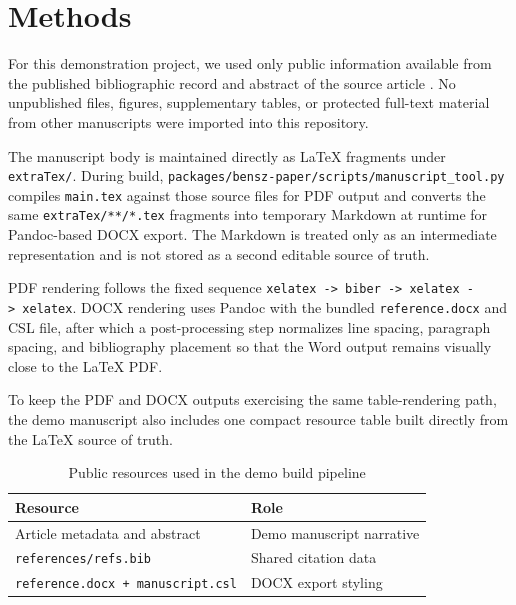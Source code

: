 \section{Methods}
For this demonstration project, we used only public information
available from the published bibliographic record and abstract of the
source article \supercite{Greenhalgh_2026}. No unpublished files, figures,
supplementary tables, or protected full-text material from other
manuscripts were imported into this repository.

The manuscript body is maintained directly as LaTeX fragments under
\texttt{extraTex/}. During build,
\texttt{packages/bensz-paper/scripts/manuscript\_tool.py} compiles
\texttt{main.tex} against those source files for PDF output and converts
the same \texttt{extraTex/**/*.tex} fragments into temporary Markdown at
runtime for Pandoc-based DOCX export. The Markdown is treated only as an
intermediate representation and is not stored as a second editable
source of truth.

PDF rendering follows the fixed sequence
\texttt{xelatex\ -\textgreater{}\ biber\ -\textgreater{}\ xelatex\ -\textgreater{}\ xelatex}.
DOCX rendering uses Pandoc with the bundled \texttt{reference.docx} and
CSL file, after which a post-processing step normalizes line spacing,
paragraph spacing, and bibliography placement so that the Word output
remains visually close to the LaTeX PDF.

To keep the PDF and DOCX outputs exercising the same table-rendering
path, the demo manuscript also includes one compact resource table built
directly from the LaTeX source of truth.

\begin{table}[htbp]
\centering
\caption{Public resources used in the demo build pipeline}
\begin{tabular}{ll}
\hline
Resource & Role \\
\hline
Article metadata and abstract & Demo manuscript narrative \\
\texttt{references/refs.bib} & Shared citation data \\
\texttt{reference.docx + manuscript.csl} & DOCX export styling \\
\hline
\end{tabular}
\end{table}
